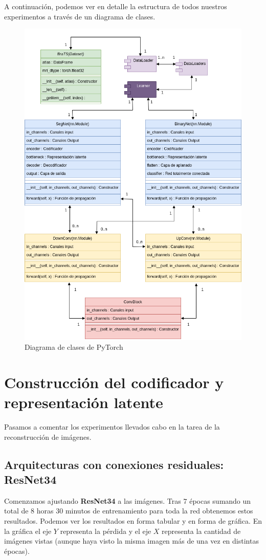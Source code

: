 A continuación, podemos ver en detalle la estructura de todos nuestros experimentos a través de un diagrama de clases.

\begin{figure}[H]
	\centering
	\includegraphics[width=0.75\linewidth]{imagenes/clases_pytorch.png}
	\caption{Diagrama de clases de PyTorch}
\end{figure}

\section{Construcción del codificador y representación latente}

Pasamos a comentar los experimentos llevados cabo en la tarea de la reconstrucción de imágenes.

\subsection{Arquitecturas con conexiones residuales: ResNet34}

Comenzamos ajustando \textbf{ResNet34} a las imágenes. Tras $7$ épocas sumando un total de $8$ horas $30$ minutos de entrenamiento para toda la red obtenemos estos resultados.
Podemos ver los resultados en forma tabular y en forma de gráfica. En la gráfica el eje $Y$ representa la pérdida y el eje $X$ representa la cantidad de imágenes vistas (aunque haya visto la misma imagen más de una vez en distintas épocas). 

